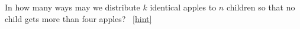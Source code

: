 \documentclass{book}
\begin{document}
\setcounter{project}{225}
\addtocounter{project}{-1}
\begin{activity}[]\label{act_restrictedmultisetspie}
\hypertarget{p-1257}{}%
In how many ways may we distribute \(k\) identical apples to \(n\) children so that no child gets more than four apples?%
~\hfill{\tiny\hyperlink{a-225}{[hint]}\hypertarget{q-225}{}}\end{activity}
\end{document}
